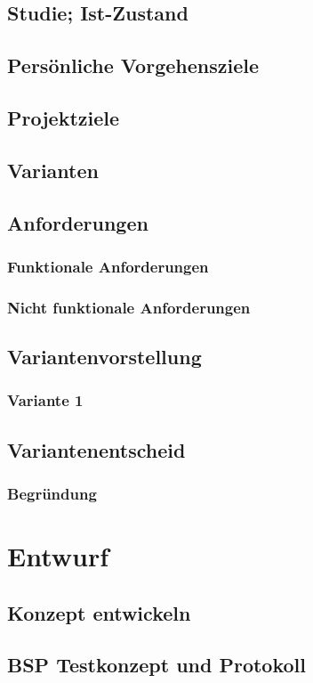 \documentclass{report}
\begin{document}
\section{Studie; Ist-Zustand}
\section{Persönliche Vorgehensziele}
\section{Projektziele}
\section{Varianten}
\section{Anforderungen}
\subsection{Funktionale Anforderungen}
\subsection{Nicht funktionale Anforderungen}
\section{Variantenvorstellung}
\subsection{Variante 1}
\section{Variantenentscheid}
\subsection{Begründung}

\chapter{Entwurf}
\section{Konzept entwickeln}
\section{BSP Testkonzept und Protokoll}
\end{document}
